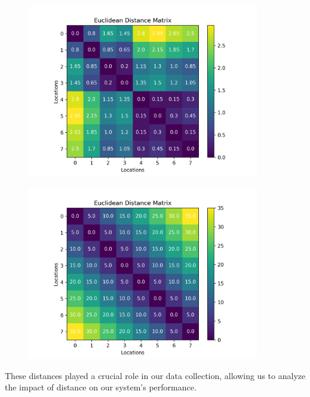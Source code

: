 \begin{figure}[h]
    \centering
    \begin{minipage}{0.5\textwidth}
        \centering
        \includegraphics[width=0.9\textwidth]{images/research_design/distance_matrix_lab.png}
        \label{fig:distance_matrix_lab}
    \end{minipage}%
    \begin{minipage}{0.5\textwidth}
        \centering
        \includegraphics[width=0.9\textwidth]{images/research_design/distance_matrix_home.png}
        \label{fig:distance_matrix_home}
    \end{minipage}
\end{figure}

These distances played a crucial role in our data collection, allowing us to analyze the impact of distance on our system's performance.


